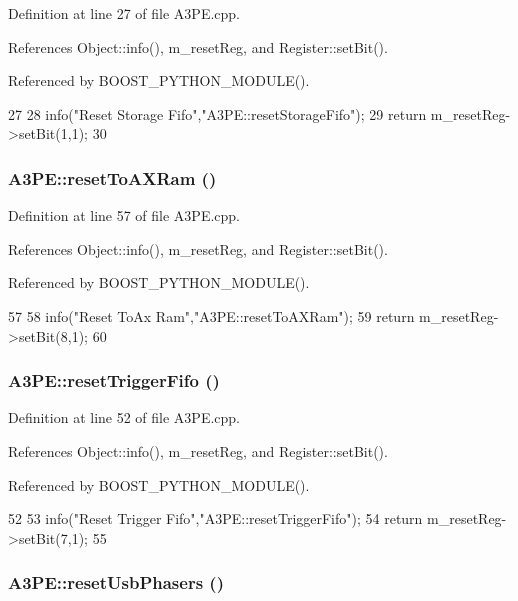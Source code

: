 Definition at line 27 of file A3PE.cpp.

References Object::info(), m\_\-resetReg, and Register::setBit().

Referenced by BOOST\_\-PYTHON\_\-MODULE().


\begin{DoxyCode}
27                                  {
28   info("Reset Storage Fifo","A3PE::resetStorageFifo");
29   return m_resetReg->setBit(1,1);
30 }
\end{DoxyCode}
\hypertarget{classA3PE_a31f72fac5a0f00bcf3a0db99bd5704ee}{
\subsubsection[{resetToAXRam}]{ A3PE::resetToAXRam ()}}
\label{classA3PE_a31f72fac5a0f00bcf3a0db99bd5704ee}


Definition at line 57 of file A3PE.cpp.

References Object::info(), m\_\-resetReg, and Register::setBit().

Referenced by BOOST\_\-PYTHON\_\-MODULE().


\begin{DoxyCode}
57                              {
58   info("Reset ToAx Ram","A3PE::resetToAXRam");
59   return m_resetReg->setBit(8,1);
60 }
\end{DoxyCode}
\hypertarget{classA3PE_ac81388bd2988192cf54034b245f69891}{
\subsubsection[{resetTriggerFifo}]{ A3PE::resetTriggerFifo ()}}
\label{classA3PE_ac81388bd2988192cf54034b245f69891}


Definition at line 52 of file A3PE.cpp.

References Object::info(), m\_\-resetReg, and Register::setBit().

Referenced by BOOST\_\-PYTHON\_\-MODULE().


\begin{DoxyCode}
52                                  {
53   info("Reset Trigger Fifo","A3PE::resetTriggerFifo");
54   return m_resetReg->setBit(7,1);
55 }
\end{DoxyCode}
\hypertarget{classA3PE_a0ad1110ea755ffd0b277284d807a8794}{
\subsubsection[{resetUsbPhasers}]{ A3PE::resetUsbPhasers ()}}
\label{classA3PE_a0ad1110ea755ffd0b277284d807a8794}



